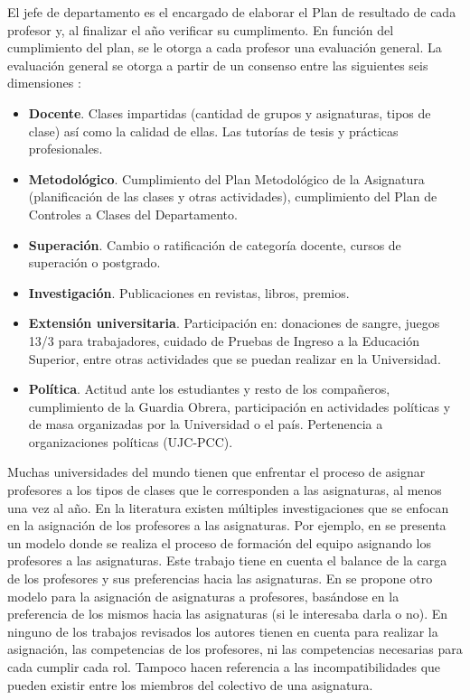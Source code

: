El jefe de departamento es el encargado de elaborar el Plan de resultado de cada profesor y, al finalizar el año verificar su cumplimento. En función del cumplimiento del plan, se le otorga a cada profesor una evaluación general. La evaluación general se otorga a partir de un consenso entre las siguientes seis dimensiones \citep{Ansola2020}:
\begin{itemize}
	\item \textbf{Docente}. Clases impartidas (cantidad de grupos y asignaturas, tipos de clase) así como la calidad de ellas. Las tutorías de tesis y prácticas profesionales.
	\item \textbf{Metodológico}. Cumplimiento del Plan Metodológico de la Asignatura (planificación de las clases y otras actividades), cumplimiento del Plan de Controles a Clases del Departamento.
	\item \textbf{Superación}. Cambio o ratificación de categoría docente, cursos de superación o postgrado.
	\item \textbf{Investigación}. Publicaciones en revistas, libros, premios.
	\item \textbf{Extensión universitaria}. Participación en: donaciones de sangre, juegos 13/3 para trabajadores, cuidado de Pruebas de Ingreso a la Educación Superior, entre otras actividades que se puedan realizar en la Universidad.
	\item \textbf{Política}. Actitud ante los estudiantes y resto de los compañeros, cumplimiento de la Guardia Obrera, participación en actividades políticas y de masa organizadas por la Universidad o el país. Pertenencia a organizaciones políticas (UJC-PCC).
\end{itemize}

Muchas universidades del mundo tienen que enfrentar el proceso de asignar profesores a los tipos de clases que le corresponden a las asignaturas, al menos una vez al año. En la literatura existen múltiples investigaciones que se enfocan en la asignación de los profesores a las asignaturas. Por ejemplo, en \cite{Domenech2014} se presenta un modelo donde se realiza el proceso de formación del equipo asignando los profesores a las asignaturas. Este trabajo tiene en cuenta el balance de la carga de los profesores y sus preferencias hacia las asignaturas. En \cite{Bosquez2020} se propone otro modelo para la asignación de asignaturas a profesores, basándose en la preferencia de los mismos hacia las asignaturas (si le interesaba darla o no). En ninguno de los trabajos revisados los autores tienen en cuenta para realizar la asignación, las competencias de los profesores, ni las competencias necesarias para cada cumplir cada rol. Tampoco hacen referencia a las incompatibilidades que pueden existir entre los miembros del colectivo de una asignatura.

